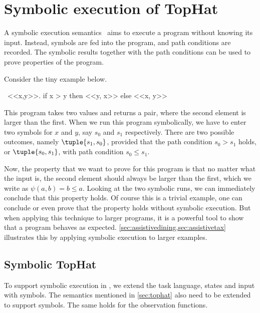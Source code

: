 
\section{Symbolic execution of TopHat}
\label{sec:symbolic}

A symbolic execution semantics~\cite{King1975,Boyer1975} aims to execute a program without knowing its input.
Instead, symbols are fed into the program, and path conditions are recorded.
The symbolic results together with the path conditions can be used to prove properties of the program.

Consider the tiny example below.
\begin{TASK}
  \ <<x,y>>. if x > y then <<y, x>> else <<x, y>>
\end{TASK}

This program takes two values and returns a pair, where the second element is larger than the first.
When we run this program symbolically, we have to enter two symbols for $x$ and $y$, say $s_0$ and $s_1$ respectively.
There are two possible outcomes, namely
$\tuple{s_1,s_0}$, provided that the path condition $s_0 > s_1$ holds, or
$\tuple{s_0,s_1}$, with path condition $s_0 \leq s_1$.

Now, the property that we want to prove for this program is that no matter what the input is, the second element should always be larger than the first, which we write as $\psi(a,b)= b \leq a$.
Looking at the two symbolic runs, we can immediately conclude that this property holds.
Of course this is a trivial example, one can conclude or even prove that the property holds without symbolic execution.
But when applying this technique to larger programs, it is a powerful tool to show that a program behaves as expected.
\cref{sec:assistivedining,sec:assistivetax} illustrates this by applying symbolic execution to larger examples.


\subsection{Symbolic TopHat}

To support symbolic execution in \TOPHAT, we extend the task language, states and input with symbols.
The semantics mentioned in \cref{sec:tophat} also need to be extended to support symbols.
The same holds for the observation functions.

